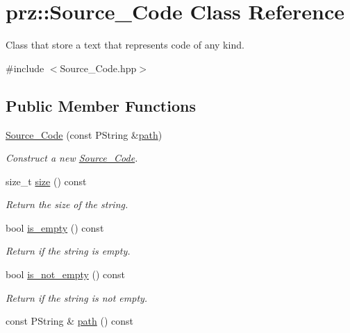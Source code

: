 \hypertarget{classprz_1_1_source___code}{}\section{prz\+::Source\+\_\+\+Code Class Reference}
\label{classprz_1_1_source___code}


Class that store a text that represents code of any kind.  




{\ttfamily \#include $<$Source\+\_\+\+Code.\+hpp$>$}

\subsection*{Public Member Functions}
\begin{DoxyCompactItemize}
\item 
\mbox{\hyperlink{classprz_1_1_source___code_a908df27e0a26b4e6b4c5197853e6cb78}{Source\+\_\+\+Code}} (const P\+String \&\mbox{\hyperlink{classprz_1_1_source___code_affa31ffbe288e203e4bd5abe86dfdcb0}{path}})
\begin{DoxyCompactList}\small\item\em Construct a new \mbox{\hyperlink{classprz_1_1_source___code}{Source\+\_\+\+Code}}. \end{DoxyCompactList}\item 
size\+\_\+t \mbox{\hyperlink{classprz_1_1_source___code_a9b99d1ce7347c92b1815806c77dad122}{size}} () const
\begin{DoxyCompactList}\small\item\em Return the size of the string. \end{DoxyCompactList}\item 
bool \mbox{\hyperlink{classprz_1_1_source___code_ac815747839c11050fac39b7ee397e22b}{is\+\_\+empty}} () const
\begin{DoxyCompactList}\small\item\em Return if the string is empty. \end{DoxyCompactList}\item 
bool \mbox{\hyperlink{classprz_1_1_source___code_aee6d2b87ef6e65d51f4041badfe3d6b9}{is\+\_\+not\+\_\+empty}} () const
\begin{DoxyCompactList}\small\item\em Return if the string is not empty. \end{DoxyCompactList}\item 
const P\+String \& \mbox{\hyperlink{classprz_1_1_source___code_affa31ffbe288e203e4bd5abe86dfdcb0}{path}} () const

\end{DoxyCompactItemize}
